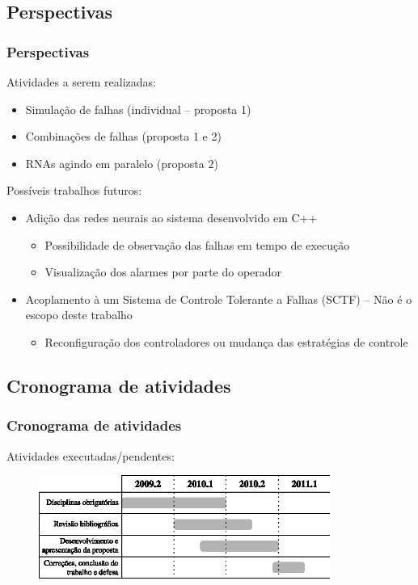 \documentclass{beamer}
\begin{document}
\subsection{Perspectivas}
\begin{frame}
    \frametitle{Perspectivas}

    Atividades a serem realizadas:

\begin{itemize}
    \item Simulação de falhas (individual -- proposta 1)
    \item Combinações de falhas (proposta 1 e 2)
    \item RNAs agindo em paralelo (proposta 2)
\end{itemize}

    Possíveis trabalhos futuros:
\begin{itemize}
    \item Adição das redes neurais ao sistema desenvolvido em C++
    \begin{itemize}
        \item Possibilidade de observação das falhas em tempo de execução
        \item Visualização dos alarmes por parte do operador
    \end{itemize}
    \item Acoplamento à um Sistema de Controle Tolerante a Falhas (SCTF) -- Não
          é o escopo deste trabalho
    \begin{itemize}
        \item Reconfiguração dos controladores ou mudança das estratégias de
              controle
    \end{itemize}
\end{itemize}

\end{frame}

\subsection{Cronograma de atividades}
\begin{frame}
    \frametitle{Cronograma de atividades}

    Atividades executadas/pendentes:

\begin{figure}[htb]
\centering
    \includegraphics[width=0.85\textwidth]{imgs/conclusoes/eps/cronograma}
\end{figure}
    
\end{frame}
\end{document}
